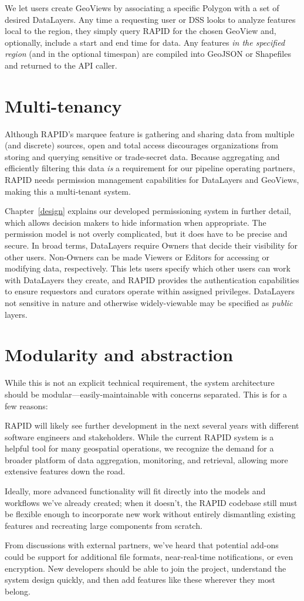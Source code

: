 We let users create GeoViews by associating a specific Polygon with a set of desired DataLayers. Any time a requesting user or DSS looks to analyze features local to the region, they simply query RAPID for the chosen GeoView and, optionally, include a start and end time for data. Any features \textit{in the specified region} (and in the optional timespan) are compiled into GeoJSON or Shapefiles and returned to the API caller.

\section{Multi-tenancy}
Although RAPID's marquee feature is gathering and sharing data from multiple (and discrete) sources, open and total access discourages organizations from storing and querying sensitive or trade-secret data. Because aggregating and efficiently filtering this data \textit{is} a requirement for our pipeline operating partners, RAPID needs permission management capabilities for DataLayers and GeoViews, making this a multi-tenant system.

Chapter~\ref{design} explains our developed permissioning system in further detail, which allows decision makers to hide information when appropriate. The permission model is not overly complicated, but it does have to be precise and secure. In broad terms, DataLayers require Owners that decide their visibility for other users. Non-Owners can be made Viewers or Editors for accessing or modifying data, respectively. This lets users specify which other users can work with DataLayers they create, and RAPID provides the authentication capabilities to ensure requestors and curators operate within assigned privileges. DataLayers not sensitive in nature and otherwise widely-viewable may be specified as \textit{public} layers.

\section{Modularity and abstraction}
While this is not an explicit technical requirement, the system architecture should be modular---easily-maintainable with concerns separated. This is for a few reasons:

RAPID will likely see further development in the next several years with different software engineers and stakeholders. While the current RAPID system is a helpful tool for many geospatial operations, we recognize the demand for a broader platform of data aggregation, monitoring, and retrieval, allowing more extensive features down the road.

Ideally, more advanced functionality will fit directly into the models and workflows we've already created; when it doesn't, the RAPID codebase still must be flexible enough to incorporate new work without entirely dismantling existing features and recreating large components from scratch.

From discussions with external partners, we've heard that potential add-ons could be support for additional file formats, near-real-time notifications, or even encryption. New developers should be able to join the project, understand the system design quickly, and then add features like these wherever they most belong.